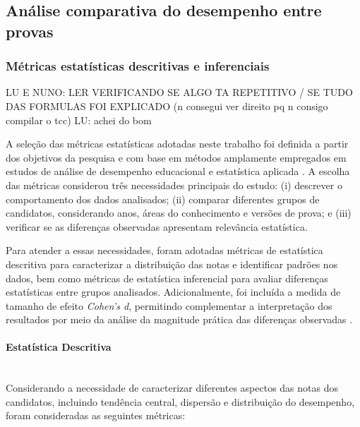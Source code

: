 \documentclass[a4paper,10pt, twocolumn]{article}
\begin{document}
\subsection{Análise comparativa do desempenho entre provas}

\subsubsection{Métricas estatísticas descritivas e inferenciais}

\label{sec:metricas-descritivas-inferenciais}
LU E NUNO: LER VERIFICANDO SE ALGO TA REPETITIVO / SE TUDO DAS FORMULAS FOI EXPLICADO (n consegui ver direito pq n consigo compilar o tcc) LU: achei do bom

A seleção das métricas estatísticas adotadas neste trabalho foi definida a partir dos objetivos da pesquisa e com base em métodos amplamente empregados em estudos de análise de desempenho educacional e estatística aplicada \cite{estatistica_descritiva_inferencial,field2018discovering,cohen1988statistical}. A escolha das métricas considerou três necessidades principais do estudo: (i) descrever o comportamento dos dados analisados; (ii) comparar diferentes grupos de candidatos, considerando anos, áreas do conhecimento e versões de prova; e (iii) verificar se as diferenças observadas apresentam relevância estatística.

Para atender a essas necessidades, foram adotadas métricas de estatística descritiva para caracterizar a distribuição das notas e identificar padrões nos dados, bem como métricas de estatística inferencial para avaliar diferenças estatísticas entre grupos analisados. Adicionalmente, foi incluída a medida de tamanho de efeito \textit{Cohen's d}, permitindo complementar a interpretação dos resultados por meio da análise da magnitude prática das diferenças observadas \cite{cohen1988statistical}.

\paragraph{Estatística Descritiva}
\mbox{}\\
Considerando a necessidade de caracterizar diferentes aspectos das notas dos candidatos, incluindo tendência central, dispersão e distribuição do desempenho, foram consideradas as seguintes métricas:
\end{document}
